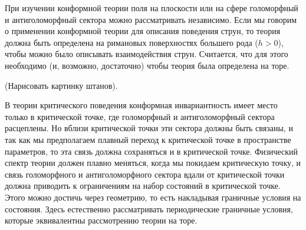 \documentclass[a4paper,12pt]{article}
\theoremstyle{definition} \newtheorem{Def}{Definition}
\begin{document}
При изучении конформной теории поля на плоскости или на сфере 
голоморфный и антиголоморфный сектора можно рассматривать независимо. 
Если мы говорим о применении конформной теории для описания поведения струн, то теория должна быть
определена на римановых поверхностях большего рода ($h>0$), чтобы можно было описывать
взаимодействия струн. Считается, что для этого необходимо (и, возможно, достаточно) чтобы теория была определена на торе.

(Нарисовать картинку штанов).

В теории критического поведения конформная инвариантность имеет место только в критической точке,
где голоморфный и антиголоморфный сектора расцеплены. Но вблизи критической точки эти сектора должны
быть связаны, и так как мы предполагаем плавный переход к критической точке в пространстве
параметров, то эта связь должна сохраняться и в критической точке. Физический спектр теории должен
плавно меняться, когда мы покидаем критическую точку, и связь голоморфного и антиголоморфного
сектора вдали от критической точки должна приводить к ограничениям на набор состояний в критической
точке. Этого можно достичь через геометрию, то есть накладывая граничные условия на состояния. Здесь
естественно рассматривать периодические граничные условия, которые эквивалентны рассмотрению теории
на торе.
\end{document}
